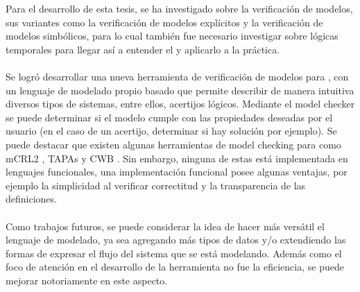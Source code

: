 Para el desarrollo de esta tesis, se ha investigado sobre la verificación de modelos, sus variantes como la verificación de modelos explícitos y la verificación de modelos simbólicos, para lo cual también fue necesario investigar sobre lógicas temporales para llegar así a entender el {\mucalculo} y aplicarlo a la práctica.\\
\\
Se logró desarrollar una nueva herramienta de verificación de modelos para {\mucalculo}, con un lenguaje de modelado propio basado que permite describir de manera intuitiva diversos tipos de sistemas, entre ellos, acertijos lógicos. Mediante el model checker se puede determinar si el modelo cumple con las propiedades deseadas por el usuario (en el caso de un acertijo, determinar si hay solución por ejemplo). Se puede destacar que existen algunas herramientas de model checking para {\mucalculo} como mCRL2 \cite{Groote:14}, TAPAs \cite{Calzolai:15} y CWB \cite{Moller:13}. Sin embargo, ninguna de estas está implementada en lenguajes funcionales, una implementación funcional posee algunas ventajas, por ejemplo la simplicidad al verificar correctitud y la transparencia de las definiciones.\\
\\
Como trabajos futuros, se puede considerar la idea de hacer más versátil el lenguaje de modelado, ya sea agregando más tipos de datos y/o extendiendo las formas de expresar el flujo del sistema que se está modelando. Además como el foco de atención en el desarrollo de la herramienta no fue la eficiencia, se puede mejorar notoriamente en este aspecto.